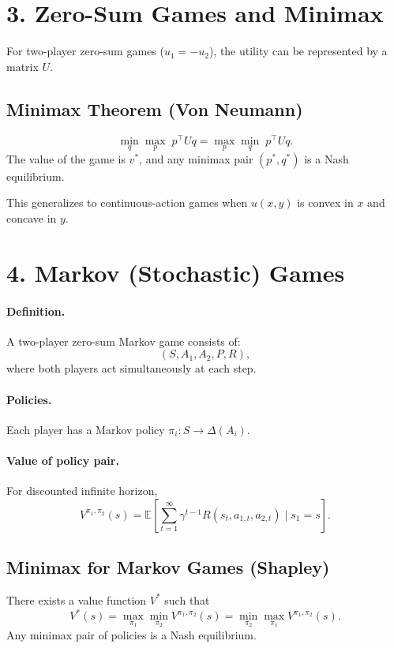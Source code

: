 \documentclass[12pt]{article}
\begin{document}
\section*{3. Zero-Sum Games and Minimax}

For two-player zero-sum games ($u_1 = -u_2$),
the utility can be represented by a matrix $U$.

\subsection*{Minimax Theorem (Von Neumann)}
\[
		\min_q \max_p \; p^\top U q
		=
		\max_p \min_q \; p^\top U q.
\]
The value of the game is $v^*$, and any minimax pair $(p^*,q^*)$ is a Nash equilibrium.

This generalizes to continuous-action games when $u(x,y)$ is convex in $x$ and concave in $y$.

\section*{4. Markov (Stochastic) Games}

\paragraph{Definition.}
A two-player zero-sum Markov game consists of:
\[
		(S, A_1, A_2, P, R),
\]
where both players act simultaneously at each step.

\paragraph{Policies.}
Each player has a Markov policy $\pi_i: S \to \Delta(A_i)$.

\paragraph{Value of policy pair.}
For discounted infinite horizon,
\[
		V^{\pi_1,\pi_2}(s)
		=
		\mathbb{E}\left[\sum_{t=1}^\infty \gamma^{t-1} R(s_t,a_{1,t},a_{2,t}) \mid s_1=s\right].
\]

\subsection*{Minimax for Markov Games (Shapley)}
There exists a value function $V^*$ such that
\[
		V^*(s) = \max_{\pi_1} \min_{\pi_2} V^{\pi_1,\pi_2}(s)
		= \min_{\pi_2} \max_{\pi_1} V^{\pi_1,\pi_2}(s).
\]
Any minimax pair of policies is a Nash equilibrium.
\end{document}
